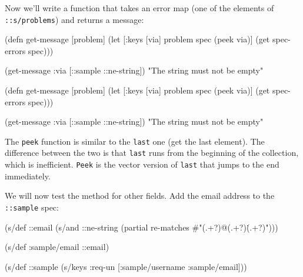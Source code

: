 \fi

\mnoindent
Now we'll write a function that takes an error map (one of the elements of \verb|::s/problems|) and returns a message:


\ifx\DEVICETYPE\MOBILE

  \begin{clojure}
(defn get-message [problem]
  (let [{:keys [via]} problem
        spec (peek via)]
    (get spec-errors spec)))

(get-message {:via [::sample
                    ::ne-string]})
"The string must not be empty"
  \end{clojure}

\else

  \begin{clojure}
(defn get-message [problem]
  (let [{:keys [via]} problem
        spec (peek via)]
    (get spec-errors spec)))

(get-message {:via [::sample ::ne-string]})
"The string must not be empty"
  \end{clojure}

\fi

The \verb|peek| function is similar to the \verb|last| one (get the last element). The difference between the two is that \verb|last| runs from the beginning of the collection, which is inefficient. \verb|Peek| is the vector version of \verb|last| that jumps to the end immediately.

We will now test the method for other fields. Add the email address to the \verb|::sample| spec:


\ifx\DEVICETYPE\MOBILE

\begin{english}
  \begin{clojure}
(s/def ::email
  (s/and
    ::ne-string
    (partial re-matches
      #"(.+?)@(.+?)\.(.+?)")))

(s/def :sample/email ::email)

(s/def ::sample
  (s/keys :req-un [:sample/username
                   :sample/email]))
  \end{clojure}
\end{english}

